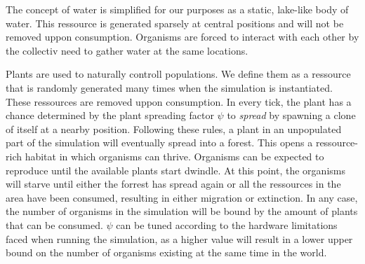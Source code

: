 The concept of water is simplified for our purposes as a static, lake-like body of water.
This ressource is generated sparsely at central positions and will not be removed uppon consumption.
Organisms are forced to interact with each other by the collectiv need to gather water at the same locations.

Plants are used to naturally controll populations. We define them as a ressource that is randomly generated
many times when the simulation is instantiated. These ressources are removed uppon consumption. In every tick, 
the plant has a chance determined by the plant spreading factor \(\psi \) to \emph{spread} by spawning a clone of itself
at a nearby position. Following these rules, a plant in an unpopulated part of the simulation will eventually spread 
into a forest.
This opens a ressource-rich habitat in which organisms can thrive. Organisms can be expected to 
reproduce until the available plants start dwindle. At this point, the organisms will starve until either 
the forrest has spread again or all the ressources in the area have been consumed, resulting in either
migration or extinction. In any case, the number of organisms in the simulation will be bound by the amount of 
plants that can be consumed. 
\(\psi \) can be tuned according to the hardware limitations faced when running the simulation, as a higher value
will result in a lower upper bound on the number of organisms existing at the same time in the world.
